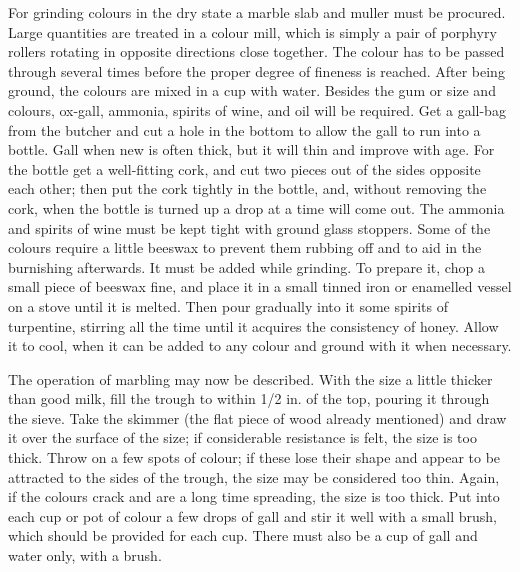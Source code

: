 \documentclass[twoside]{book}
\begin{document}
For grinding colours in the dry state a marble
slab and muller must be procured. Large quantities
are treated in a colour mill, which is simply a pair
of porphyry rollers rotating in opposite directions
close together. The colour has to be passed
through several times before the proper degree of
fineness is reached. After being ground, the
colours are mixed in a cup with water. Besides the
gum or size and colours, ox-gall, ammonia, spirits
of wine, and oil will be required. Get a gall-bag
from the butcher and cut a hole in the bottom to
allow the gall to run into a bottle. Gall when new
is often thick, but it will thin and improve with
age. For the bottle get a well-fitting cork, and cut
two pieces out of the sides opposite each other;
then put the cork tightly in the bottle, and, without
removing the cork, when the bottle is turned up a
drop at a time will come out. The ammonia and
spirits of wine must be kept tight with ground glass
stoppers. Some of the colours require a little
beeswax to prevent them rubbing off and to aid in the
burnishing afterwards. It must be added while
grinding. To prepare it, chop a small piece of
beeswax fine, and place it in a small tinned iron
\pagebreak
or enamelled vessel on a stove until it is melted.
Then pour gradually into it some spirits of turpentine,
stirring all the time until it acquires the
consistency of honey. Allow it to cool, when it
can be added to any colour and ground with it when
necessary.

The operation of marbling may now be described.
With the size a little thicker than good milk, fill
the trough to within 1/2 in. of the top, pouring it
through the sieve. Take the skimmer (the flat
piece of wood already mentioned) and draw it over
the surface of the size; if considerable resistance is
felt, the size is too thick. Throw on a few spots of
colour; if these lose their shape and appear to be
attracted to the sides of the trough, the size may be
considered too thin. Again, if the colours crack
and are a long time spreading, the size is too thick.
Put into each cup or pot of colour a few drops of
gall and stir it well with a small brush, which should
be provided for each cup. There must also be a
cup of gall and water only, with a brush.
\end{document}
